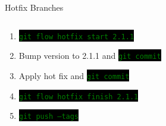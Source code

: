 \documentclass[
14pt,
aspectratio=169,
usenames,
dvipsnames,
x11names]{beamer}
\newcommand{\code}[1]{{\small\colorbox{black}{\textcolor{green}{\texttt{#1}}}}}
\newcommand{\shadowbox}[2]{%
  \hbox{%
    \begin{tcolorbox}[beamer,
      width=#1,
      drop fuzzy shadow=black,
      arc=0pt,
      boxsep=0pt,
      left=0pt,right=0pt,top=0pt,bottom=0pt,
      ]%
      #2
    \end{tcolorbox}
  }
}
\begin{document}
\begin{frame}{Hotfix Branches}
  \begin{columns}
    \begin{column}{.65\linewidth}
      \minipage[c][0.75\textheight][s]{\columnwidth}
      \begin{enumerate} \setlength{\itemsep}{\fill}
      \item \code{git flow hotfix start 2.1.1}
      \item Bump version to 2.1.1 and \code{git commit}
      \item Apply hot fix and \code{git commit}
      \item \code{git flow hotfix finish 2.1.1}
      \item \code{git push --tags}
      \end{enumerate}
      \endminipage
    \end{column}
  \end{columns}
\end{frame}
\end{document}
